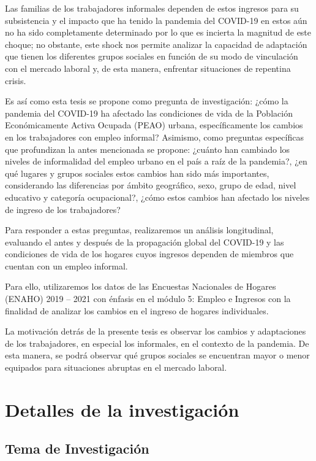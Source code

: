 \documentclass[
  letterpaper,
  12pt,
  oneside,
  spanish,
  doublespacing,
  headsepline,
  parskip]{MastersDoctoralThesis}
\begin{document}
Las familias de los trabajadores informales dependen de estos ingresos
para su subsistencia y el impacto que ha tenido la pandemia del COVID-19
en estos aún no ha sido completamente determinado por lo que es incierta
la magnitud de este choque; no obstante, este shock nos permite analizar
la capacidad de adaptación que tienen los diferentes grupos sociales en
función de su modo de vinculación con el mercado laboral y, de esta
manera, enfrentar situaciones de repentina crisis.

Es así como esta tesis se propone como pregunta de investigación: ¿cómo
la pandemia del COVID-19 ha afectado las condiciones de vida de la
Población Económicamente Activa Ocupada (PEAO) urbana, específicamente
los cambios en los trabajadores con empleo informal? Asimismo, como
preguntas específicas que profundizan la antes mencionada se propone:
¿cuánto han cambiado los niveles de informalidad del empleo urbano en el
país a raíz de la pandemia?, ¿en qué lugares y grupos sociales estos
cambios han sido más importantes, considerando las diferencias por
ámbito geográfico, sexo, grupo de edad, nivel educativo y categoría
ocupacional?, ¿cómo estos cambios han afectado los niveles de ingreso de
los trabajadores?

Para responder a estas preguntas, realizaremos un análisis longitudinal,
evaluando el antes y después de la propagación global del COVID-19 y las
condiciones de vida de los hogares cuyos ingresos dependen de miembros
que cuentan con un empleo informal.

Para ello, utilizaremos los datos de las Encuestas Nacionales de Hogares
(ENAHO) 2019 -- 2021 con énfasis en el módulo 5: Empleo e Ingresos con
la finalidad de analizar los cambios en el ingreso de hogares
individuales.

La motivación detrás de la presente tesis es observar los cambios y
adaptaciones de los trabajadores, en especial los informales, en el
contexto de la pandemia. De esta manera, se podrá observar qué grupos
sociales se encuentran mayor o menor equipados para situaciones abruptas
en el mercado laboral.


\hypertarget{sec-detalles}{%
\chapter{Detalles de la investigación}\label{sec-detalles}}

\hypertarget{tema-de-investigaciuxf3n}{%
\section{Tema de Investigación}\label{tema-de-investigaciuxf3n}}
\end{document}
